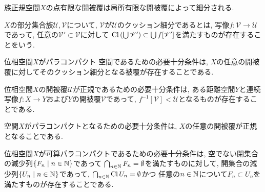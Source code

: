 \documentclass[uplatex, dvipdfmx, a4paper, 12pt, class=jsbook, crop=false]{standalone}
\begin{document}
\begin{proposition}
	族正規空間$ X $の点有限な開被覆は局所有限な開被覆によって細分される.
\end{proposition}

\begin{definition}
	$ X $の部分集合族$ \mathscr{U}, \mathscr{V} $について, $ \mathscr{V} $が$ \mathscr{U} $のクッション細分であるとは,
	写像$ f \colon \mathscr{V} \to \mathscr{U} $であって, 任意の$ \mathscr{V}' \subset \mathscr{V} $に対して
	$ \mathop{\mathrm{Cl}}\nolimits \left(\bigcup \mathscr{V}' \right) \subset \bigcup f[\mathscr{V}'] $を満たすものが存在することをいう.
\end{definition}

\begin{theorem}
	位相空間$ X $がパラコンパクト  空間であるための必要十分条件は,
	$ X $の任意の開被覆に対してそのクッション細分となる被覆が存在することである.
\end{theorem}

\begin{proposition}
	位相空間$ X $の開被覆$ \mathscr{U} $が正規であるための必要十分条件は,
	ある距離空間$ Y $と連続写像$ f \colon X \to Y $および$ Y $の開被覆$ \mathscr{V} $であって,
	$ f^{-1}[\mathscr{V}] < \mathscr{U} $となるものが存在することである.
\end{proposition}

\begin{theorem}
	 空間$ X $がパラコンパクトとなるための必要十分条件は, $ X $の任意の開被覆が正規となることである.
\end{theorem}

\begin{theorem}
	位相空間$ X $が可算パラコンパクトであるための必要十分条件は,
	空でない閉集合の減少列$ \setcomp{F_n}{n \in \N} $であって
	$ \bigcap_{n \in \mathbb{N}} F_n = \emptyset $を満たすものに対して,
	開集合の減少列$ \setcomp{U_n}{n \in \N} $であって,
	$ \bigcap_{n \in \mathbb{N}} \mathop{\mathrm{Cl}}\nolimits U_n = \emptyset $かつ
	任意の$ n \in \mathbb{N} $について$ F_n \subset U_n $を満たすものが存在することである.
\end{theorem}
\end{document}
